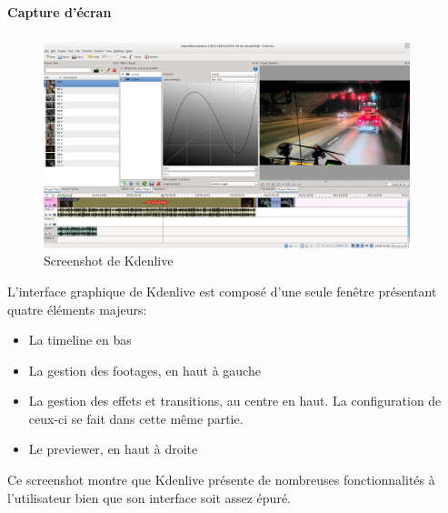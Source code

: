 \paragraph {Capture d'écran}

\subparagraph{}

\begin{figure}[H]

  \begin{center}

    \includegraphics[width=0.95\textwidth]{images/kdenlive}

  \end{center}

  \caption{Screenshot de Kdenlive}

  \label{Yes}

\end{figure}

L'interface graphique de Kdenlive est composé d'une seule fenêtre
présentant quatre éléments majeurs:

\begin{itemize}

  \item {La timeline en bas}

  \item {La gestion des footages, en haut à gauche}

  \item {La gestion des effets et transitions, au centre en haut. La
  configuration de ceux-ci se fait dans cette même partie.}

  \item {Le previewer, en haut à droite}

\end{itemize}


Ce screenshot montre que Kdenlive présente de nombreuses fonctionnalités
à l'utilisateur bien que son interface soit assez épuré.

